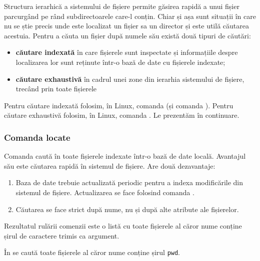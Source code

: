 Structura ierarhică a sistemului de fișiere permite găsirea rapidă a unui fișier parcurgând pe rând subdirectoarele care-l conțin.
Chiar și așa sunt situații în care nu se știe precis unde este localizat un fișier sa un director și este utilă căutarea acestuia.
Pentru a căuta un fișier după numele său există două tipuri de căutări:

\begin{itemize}
  \item \textbf{căutare indexată} în care fișierele sunt inspectate și informațiile despre localizarea lor sunt reținute într-o bază de date cu fișierele indexate;
  \item \textbf{căutare exhaustivă} în cadrul unei zone din ierarhia sistemului de fișiere, trecând prin toate fișierele
\end{itemize}

Pentru căutare indexată folosim, în Linux, comanda  (și comanda ).
Pentru căutare exhaustivă folosim, în Linux, comanda .
Le prezentăm în continuare.

\subsubsection{Comanda locate}
\label{sec:fs:locate}

Comanda  caută în toate fișierele indexate într-o bază de date locală.
Avantajul său este căutarea rapidă în sistemul de fișiere.
Are două dezavantaje:

\begin{enumerate}
  \item Baza de date trebuie actualizată periodic pentru a indexa modificările din sistemul de fișiere.
    Actualizarea se face folosind comanda .
  \item Căutarea se face strict după nume, nu și după alte atribute ale fișierelor.
\end{enumerate}

Rezultatul rulării comenzii este o listă cu toate fișierele al căror nume conține șirul de caractere trimis ca argument.

În  se caută toate fișierele al căror nume conține șirul \texttt{pwd}.


